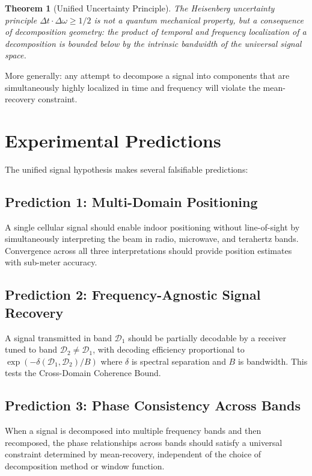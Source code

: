 \documentclass[twocolumn,11pt,a4paper]{article}
\newtheorem{theorem}{Theorem}[section]
\newcommand{\domain}{\mathcal{D}}
\newcommand{\freq}{\omega}
\begin{document}
\begin{theorem}[Unified Uncertainty Principle]
The Heisenberg uncertainty principle $\Delta t \cdot \Delta \freq \geq 1/2$ is not a quantum mechanical property, but a consequence of decomposition geometry: the product of temporal and frequency localization of a decomposition is bounded below by the intrinsic bandwidth of the universal signal space.
\end{theorem}

More generally: any attempt to decompose a signal into components that are simultaneously highly localized in time and frequency will violate the mean-recovery constraint.

\section{Experimental Predictions}
\label{sec:predictions}

The unified signal hypothesis makes several falsifiable predictions:

\subsection{Prediction 1: Multi-Domain Positioning}

A single cellular signal should enable indoor positioning without line-of-sight by simultaneously interpreting the beam in radio, microwave, and terahertz bands. Convergence across all three interpretations should provide position estimates with sub-meter accuracy.

\subsection{Prediction 2: Frequency-Agnostic Signal Recovery}

A signal transmitted in band $\domain_1$ should be partially decodable by a receiver tuned to band $\domain_2 \neq \domain_1$, with decoding efficiency proportional to $\exp(-\delta(\domain_1, \domain_2) / B)$ where $\delta$ is spectral separation and $B$ is bandwidth. This tests the Cross-Domain Coherence Bound.

\subsection{Prediction 3: Phase Consistency Across Bands}

When a signal is decomposed into multiple frequency bands and then recomposed, the phase relationships across bands should satisfy a universal constraint determined by mean-recovery, independent of the choice of decomposition method or window function.
\end{document}
